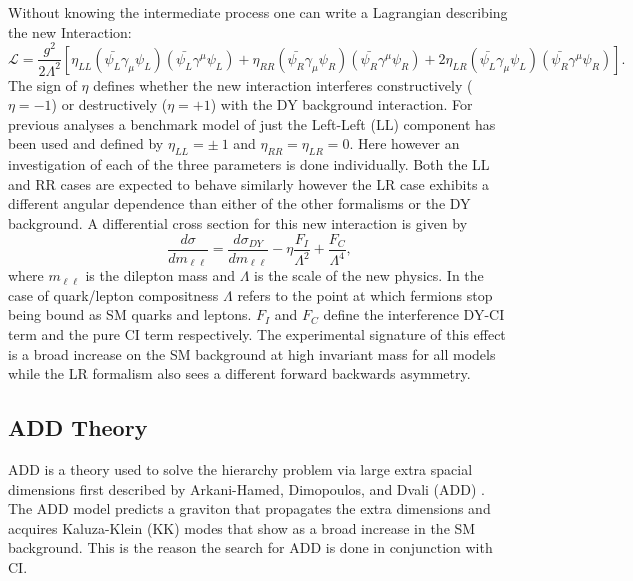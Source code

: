 Without knowing the intermediate process one can write a Lagrangian describing the new Interaction:
\begin{equation}
        \mathcal{L} = \frac{g^{2}}{2\Lambda^{2}}
                [\eta_{LL} (\bar{\psi_{L}}\gamma_{\mu}\psi_{L}) (\bar{\psi_{L}}\gamma^{\mu}\psi_{L}) 
                + \eta_{RR} (\bar{\psi_{R}}\gamma_{\mu}\psi_{R}) (\bar{\psi_{R}}\gamma^{\mu}\psi_{R}) 
                + 2\eta_{LR} (\bar{\psi_{L}}\gamma_{\mu}\psi_{L}) (\bar{\psi_{R}}\gamma^{\mu}\psi_{R}) ].
\end{equation}
The sign of $\eta$ defines whether the new interaction interferes constructively ($\eta = -1$) or destructively ($\eta = +1$) with the DY background interaction. For previous analyses \cite{CDF, D0, ATLAS} a benchmark model of just the Left-Left (LL) component has been used and defined by $\eta_{LL} = \pm~1$ and $\eta_{RR} = \eta_{LR} = 0$. Here however an investigation of each of the three parameters is done individually. Both the LL and RR cases are expected to behave similarly however the LR case exhibits a different angular dependence than either of the other formalisms or the DY background.
A differential cross section for this new interaction is given by
\begin{equation}
        \frac{d\sigma}{dm_{\ell\ell}} = 
                \frac{d\sigma_{DY}}{dm_{\ell\ell}} 
                - \eta\frac{F_{I}}{\Lambda^{2}} 
                + \frac{F_{C}}{\Lambda^{4}},
\label{eq:DiffCross}
\end{equation}
where $m_{\ell\ell}$ is the dilepton mass and $\Lambda$ is the scale of the new physics. In the case of quark/lepton compositness $\Lambda$ refers to the point at which fermions stop being bound as SM quarks and leptons. $F_{I}$ and $F_{C}$ define the interference DY-CI term and the pure CI term respectively. The experimental signature of this effect is a broad increase on the SM background at high invariant mass for all models while the LR formalism also sees a different forward backwards asymmetry.


\newpage





\subsection{ADD Theory}
ADD is a theory used to solve the hierarchy problem via large extra spacial dimensions first described by Arkani-Hamed, Dimopoulos, and Dvali (ADD) \cite{ADD}. The ADD model predicts a graviton that propagates the extra dimensions and acquires Kaluza-Klein (KK) modes that show as a broad increase in the SM background. This is the reason the search for ADD is done in conjunction with CI.


